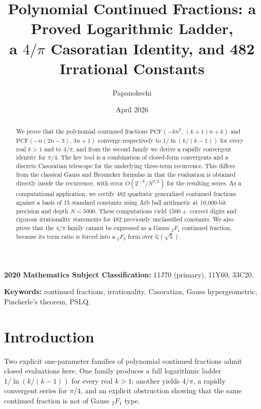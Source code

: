 \documentclass[11pt,a4paper]{article}
\title{Polynomial Continued Fractions: a Proved Logarithmic Ladder,\\
a \texorpdfstring{$4/\pi$}{4/pi} Casoratian Identity, and 482 Irrational Constants}
\author{Papanokechi}
\date{April 2026}
\theoremstyle{plain}
\theoremstyle{definition}
\theoremstyle{remark}
\newcommand{\PCF}{\mathrm{PCF}}
\begin{document}
\maketitle

\begin{abstract}
We prove that the polynomial continued fractions
$\PCF(-kn^2,\,(k{+}1)n{+}k)$ and $\PCF(-n(2n{-}3),\,3n{+}1)$
converge respectively to $1/\ln(k/(k{-}1))$ for every real $k>1$
and to $4/\pi$, and from the second family we derive a rapidly
convergent identity for $\pi/4$.
The key tool is a combination of closed-form convergents and a
discrete Casoratian telescope for the underlying three-term recurrence.
This differs from the classical Gauss and Brouncker formulas in that
the evaluation is obtained directly inside the recurrence, with error
$O(2^{-N}/N^{7/2})$ for the resulting series.
As a computational application, we certify 482 quadratic generalized
continued fractions against a basis of 15 standard constants using Arb
ball arithmetic at 10,000-bit precision and depth $N=5000$.
These computations yield $1500{+}$ correct digits and rigorous
irrationality statements for 482 previously unclassified constants.
We also prove that the $4/\pi$ family cannot be expressed as a Gauss
${}_2F_1$ continued fraction, because its term ratio is forced into a
${}_2F_3$ form over $\mathbb{Q}(\sqrt{5})$.
\end{abstract}

\noindent
\textbf{2020 Mathematics Subject Classification:}
11J70 (primary), 11Y60, 33C20.

\noindent
\textbf{Keywords:}
continued fractions, irrationality, Casoratian,
Gauss hypergeometric, Pincherle's theorem, PSLQ.

\tableofcontents

\section{Introduction}\label{sec:intro}

Two explicit one-parameter families of polynomial continued fractions admit
closed evaluations here. One family produces a full logarithmic ladder
$1/\ln(k/(k{-}1))$ for every real $k>1$; another yields $4/\pi$, a rapidly
convergent series for $\pi/4$, and an explicit obstruction showing that the
same continued fraction is not of Gauss ${}_2F_1$ type.
\end{document}
